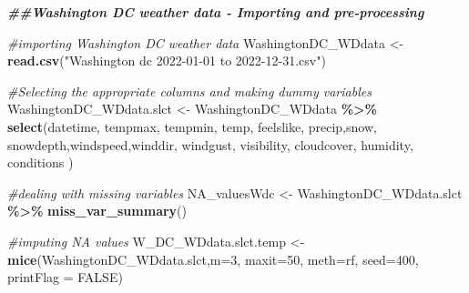 \documentclass[
]{article}
\newenvironment{Shaded}{\begin{snugshade}}{\end{snugshade}}
\newcommand{\AttributeTok}[1]{\textcolor[rgb]{0.13,0.29,0.53}{#1}}
\newcommand{\CommentTok}[1]{\textcolor[rgb]{0.56,0.35,0.01}{\textit{#1}}}
\newcommand{\ConstantTok}[1]{\textcolor[rgb]{0.56,0.35,0.01}{#1}}
\newcommand{\DecValTok}[1]{\textcolor[rgb]{0.00,0.00,0.81}{#1}}
\newcommand{\DocumentationTok}[1]{\textcolor[rgb]{0.56,0.35,0.01}{\textbf{\textit{#1}}}}
\newcommand{\FunctionTok}[1]{\textcolor[rgb]{0.13,0.29,0.53}{\textbf{#1}}}
\newcommand{\NormalTok}[1]{#1}
\newcommand{\OtherTok}[1]{\textcolor[rgb]{0.56,0.35,0.01}{#1}}
\newcommand{\SpecialCharTok}[1]{\textcolor[rgb]{0.81,0.36,0.00}{\textbf{#1}}}
\newcommand{\StringTok}[1]{\textcolor[rgb]{0.31,0.60,0.02}{#1}}
\begin{document}
\begin{Shaded}
\end{Shaded}

\begin{Shaded}
\begin{Highlighting}[]
\DocumentationTok{\#\#Washington DC weather data {-} Importing and pre{-}processing }

\CommentTok{\#importing Washington DC weather data }
\NormalTok{WashingtonDC\_WDdata }\OtherTok{\textless{}{-}} \FunctionTok{read.csv}\NormalTok{(}\StringTok{"Washington dc 2022{-}01{-}01 to 2022{-}12{-}31.csv"}\NormalTok{)}

\CommentTok{\#Selecting the appropriate columns and making dummy variables }
\NormalTok{WashingtonDC\_WDdata.slct }\OtherTok{\textless{}{-}}\NormalTok{ WashingtonDC\_WDdata }\SpecialCharTok{\%\textgreater{}\%}
  \FunctionTok{select}\NormalTok{(datetime, tempmax, tempmin, temp, }
\NormalTok{          feelslike, precip,snow, snowdepth,windspeed,winddir, }
\NormalTok{          windgust, visibility, cloudcover, humidity, conditions )}

\CommentTok{\#dealing with missing variables}
\NormalTok{NA\_valuesWdc }\OtherTok{\textless{}{-}}\NormalTok{ WashingtonDC\_WDdata.slct }\SpecialCharTok{\%\textgreater{}\%}
  \FunctionTok{miss\_var\_summary}\NormalTok{()}

\CommentTok{\#imputing NA values}
\NormalTok{W\_DC\_WDdata.slct.temp }\OtherTok{\textless{}{-}} \FunctionTok{mice}\NormalTok{(WashingtonDC\_WDdata.slct,}\AttributeTok{m=}\DecValTok{3}\NormalTok{, }
                              \AttributeTok{maxit=}\DecValTok{50}\NormalTok{, }
                              \AttributeTok{meth=}\StringTok{\textquotesingle{}rf\textquotesingle{}}\NormalTok{, }
                              \AttributeTok{seed=}\DecValTok{400}\NormalTok{, }
                              \AttributeTok{printFlag =} \ConstantTok{FALSE}\NormalTok{)}
\end{Highlighting}
\end{Shaded}
\end{document}
